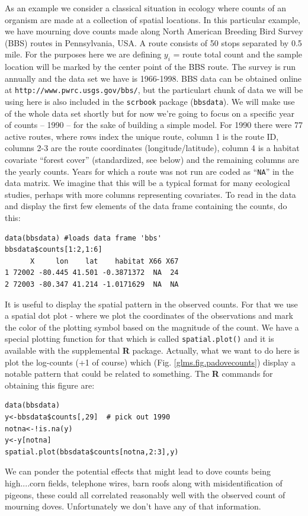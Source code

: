 As an example we consider a classical situation in ecology where
counts of an organism are made at a collection of spatial
locations. In this particular example, we have mourning dove counts
made along North American Breeding Bird Survey (BBS) routes in
Pennsylvania, USA. A route consists of 50 stops separated by 0.5
mile. For the purposes here we are defining $y_i$ = route total count
and the sample location will be marked by the center point of the BBS
route.  The survey is run annually and the data set we have is
1966-1998. BBS data can be obtained online at \mbox{\tt http:\//\//www.pwrc.usgs.gov\//bbs\//}, but the particulart chunk of data we will be using here is also included in the {\tt scrbook} package ({\tt bbsdata}).
We will make use of the whole data set shortly but for now we're going
to focus on a specific year of counts -- 1990 -- for the sake of
building a simple model.
 For 1990 there were 77 active routes, where rows index the unique route, column 1 is the
route ID, columns 2-3 are the route coordinates (longitude/latitude),
column 4 is a habitat covariate ``forest cover'' (standardized, see
below) and the remaining columns are the yearly counts. Years for
which a route was not run are coded as ``\mbox{\tt NA}'' in the data matrix. We
imagine that this will be a typical format for many ecological
studies, perhaps with more columns representing covariates.  To read
in the data and display the first few elements of the data frame containing the counts, do
this:
{\small
\begin{verbatim}
data(bbsdata) #loads data frame 'bbs'
bbsdata$counts[1:2,1:6]
      X     lon    lat    habitat X66 X67
1 72002 -80.445 41.501 -0.3871372  NA  24
2 72003 -80.347 41.214 -1.0171629  NA  NA
\end{verbatim}
}

It is useful to display the spatial pattern in the observed counts. For that we use a
spatial dot plot - where we plot the coordinates of the observations
and mark the color of the plotting symbol based on the magnitude of
the count.  We have a special plotting function for that which is
called \mbox{\tt spatial.plot()} and it is available with the
supplemental {\bf R} package.
Actually, what we want to do here is plot the
log-counts (+1 of course) which (Fig. \ref{glms.fig.padovecounts}) display a notable pattern that could
be related to something. The {\bf R} commands for obtaining this figure are:
{\small
\begin{verbatim}
data(bbsdata)
y<-bbsdata$counts[,29]  # pick out 1990
notna<-!is.na(y)
y<-y[notna]
spatial.plot(bbsdata$counts[notna,2:3],y)
\end{verbatim}
}
 We can ponder the potential effects that
might lead to dove counts being high....corn fields, telephone wires,
barn roofs along with misidentification of pigeons, these could all
correlated reasonably well with the observed count of mourning doves.
Unfortunately we don't have any of that information.

